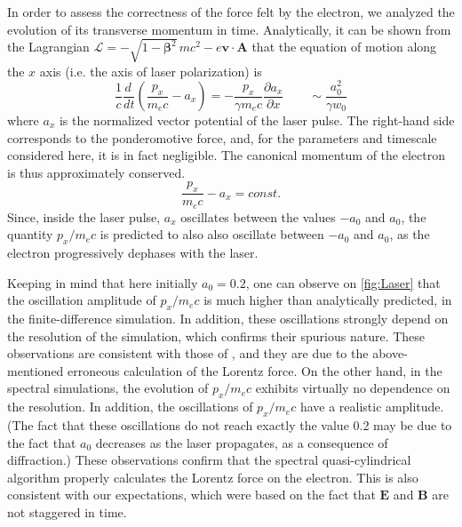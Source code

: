 \documentclass[1p,times,authoryear]{elsarticle}
\renewcommand{\vec}[1]{\boldsymbol{#1}}
\begin{document}
In order to assess the correctness of the force felt by the electron,
we analyzed the evolution of its transverse momentum in
time. Analytically, it can be shown from the Lagrangian 
$\mathcal{L} = - \sqrt{1-\vec{\beta}^2} \,mc^2 - e \vec{v} \cdot
\vec{A}$ that the equation of motion along the $x$ axis (i.e. the axis of laser polarization) is 
\[ \frac{1}{c}\frac{d \,}{dt} \left( \frac{p_x}{m_e c} - a_x \right) =
 - \frac{p_x}{\gamma m_e c}\frac{\partial a_x}{\partial x} \qquad \sim
\frac{a_0^2}{\gamma w_0} \]
\noindent where $a_x$ is the normalized vector potential of the laser
pulse. The right-hand side corresponds to the ponderomotive force, and,
for the parameters and timescale considered here, it is in fact
negligible. The canonical momentum of the
electron is thus approximately conserved.
\[ \frac{p_x}{m_e c} - a_x  = const. \]
\noindent Since, inside the laser pulse, $a_x$ oscillates between the values $-a_0$ and $a_0$,
the quantity $p_x/m_e c$ is predicted to also also oscillate
between $-a_0$ and $a_0$, as the electron progressively
dephases with the laser. 

Keeping in mind that here initially $a_0=0.2$, one can observe on
\cref{fig:Laser} that the oscillation amplitude of $p_x/m_e c$
is much higher than analytically predicted, in the finite-difference
simulation. In addition, these oscillations strongly depend on the
resolution of the simulation, which confirms their spurious nature. These
observations are consistent with those of \citep{LehePRSTAB2014}, and
they are due to the above-mentioned erroneous calculation of the
Lorentz force. On the other hand, in the spectral simulations, the
evolution of $p_x/m_e c$ exhibits virtually no dependence on the
resolution. In addition, the oscillations of $p_x/m_e c$ have a realistic
amplitude. (The fact that these oscillations do not reach exactly the
value 0.2 may be due to the fact that $a_0$ decreases as the laser
propagates, as a consequence of diffraction.) These observations
confirm that the spectral quasi-cylindrical algorithm properly calculates
the Lorentz force on the electron. This is also consistent with our
expectations, which were based on the fact that $\vec{E}$ and $\vec{B}$ are not
staggered in time.
\end{document}
